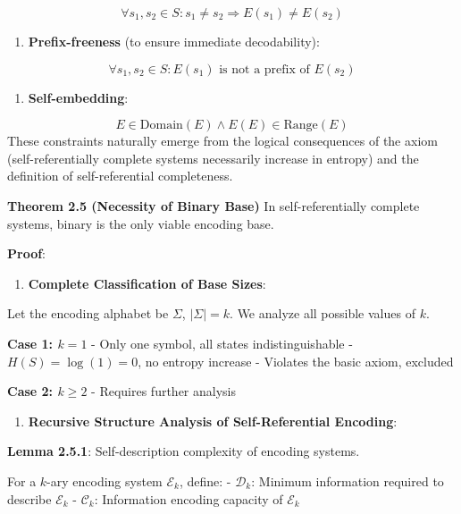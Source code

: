 \begin{equation}
\forall s_1, s_2 \in S: s_1 \neq s_2 \Rightarrow E(s_1) \neq E(s_2)
\end{equation}
\begin{enumerate}
\item \textbf{Prefix-freeness} (to ensure immediate decodability):
\end{enumerate}
   
\begin{equation}
\forall s_1, s_2 \in S: E(s_1) \text{ is not a prefix of } E(s_2)
\end{equation}
\begin{enumerate}
\item \textbf{Self-embedding}:
\end{enumerate}
   
\begin{equation}
E \in \text{Domain}(E) \land E(E) \in \text{Range}(E)
\end{equation}
These constraints naturally emerge from the logical consequences of the axiom (self-referentially complete systems necessarily increase in entropy) and the definition of self-referential completeness.

\textbf{Theorem 2.5 (Necessity of Binary Base)}
\label{thm:2.5}
In self-referentially complete systems, binary is the only viable encoding base.

\textbf{Proof}:

\begin{enumerate}
\item \textbf{Complete Classification of Base Sizes}:
\end{enumerate}
   Let the encoding alphabet be $\Sigma$, $|\Sigma| = k$. We analyze all possible values of $k$.
   
   \textbf{Case 1: $k = 1$}
   - Only one symbol, all states indistinguishable
   - $H(S) = \log(1) = 0$, no entropy increase
   - Violates the basic axiom, excluded
   
   \textbf{Case 2: $k \geq 2$}
   - Requires further analysis
   
\begin{enumerate}
\item \textbf{Recursive Structure Analysis of Self-Referential Encoding}:
\end{enumerate}
   
   \textbf{Lemma 2.5.1}: Self-description complexity of encoding systems.
\label{lem:2.5.1}
   
   For a $k$-ary encoding system $\mathcal{E}_k$, define:
   - $\mathcal{D}_k$: Minimum information required to describe $\mathcal{E}_k$
   - $\mathcal{C}_k$: Information encoding capacity of $\mathcal{E}_k$
   
